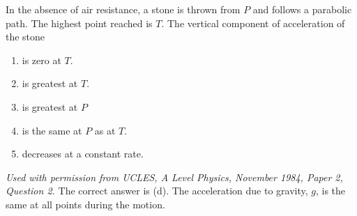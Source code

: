 \begin{problem} 
{In the absence of air resistance, a stone is thrown from $P$ and follows a parabolic path. The highest point reached is $T$. The vertical component of acceleration of the stone
\begin{enumerate}
	\item is zero at $T$.
	\item is greatest at $T$.
	\item is greatest at $P$
	\item is the same at $P$ as at $T$.
	\item decreases at a constant rate.
\end{enumerate}
}
{\textit{Used with permission from UCLES, A Level Physics, November 1984, Paper 2, Question 2.}}
{The correct answer is (d). The acceleration due to gravity, $g$, is the same at all points during the motion.
}
\end{problem}
